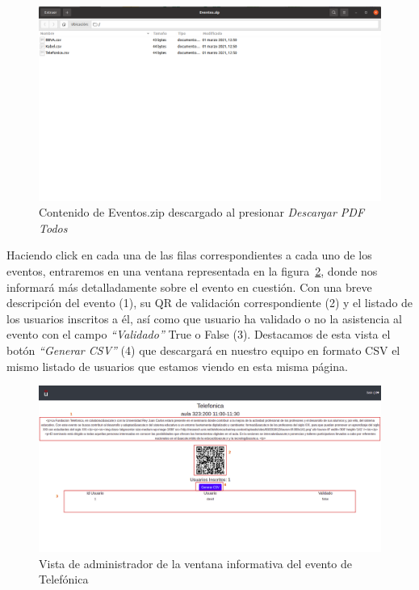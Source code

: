 \documentclass[a4paper, 12pt]{book}
\begin{document}
\begin{enumerate}
	\begin{figure}[h!]
  	\centering
  	\includegraphics[width=16cm, keepaspectratio]{img/AdminEventosZip.png}
  	\caption{Contenido de Eventos.zip descargado al presionar \textit{Descargar PDF Todos}}\label{fig:AdminEventosZip}
	\end{figure}
	
	 
	Haciendo click en cada una de las filas correspondientes a cada uno de los eventos, entraremos en una ventana representada en la figura~\ref{fig:adminListaEventoTelefonica}, donde nos informará más detalladamente sobre el evento en cuestión. Con una breve descripción del evento (1), su QR de validación correspondiente (2) y el listado de los usuarios inscritos a él, así como que usuario ha validado o no la asistencia al evento con el campo \textit{``Validado''} True o False (3). Destacamos de esta vista el botón \textit{``Generar CSV''} (4) que descargará en nuestro equipo en formato CSV el mismo listado de usuarios que estamos viendo en esta misma página.
	
	\begin{figure}[h!]
  	\centering
  	\includegraphics[width=16cm, keepaspectratio]{img/adminListaEventoTelefonica.png}
  	\caption{Vista de administrador de la ventana informativa del evento de Telefónica}\label{fig:adminListaEventoTelefonica}
	\end{figure}



\end{enumerate}
\end{document}
